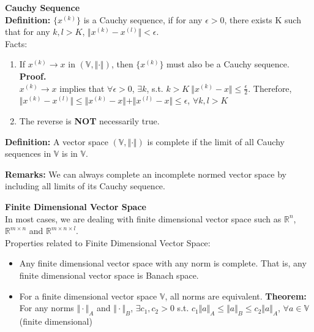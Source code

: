 \documentclass{article}
\begin{document}
\bigbreak

\textbf{Cauchy Sequence} \\
\textbf{Definition:} $\{x^{(k)}\}$ is a Cauchy sequence, if for any $\epsilon >  0$, there exists K such that for any $k,l >  K$, $\Vert x^{(k)} - x^{(l)} \Vert <  \epsilon$.  \\
    Facts: 
    \begin{enumerate}
        \item If $x^{(k)} \to x$ in $(\mathbb{V},\Vert \cdot \Vert)$, then $\{x^{(k)}\}$ must also be a Cauchy sequence. \\
        \textbf{Proof.} \\
        $x^{(k)} \to x$ implies that $\forall \epsilon >  0$, $\exists k$, s.t. $k >  K \ \Vert x^{(k)} - x \Vert \leq \frac{\epsilon}{2}$. Therefore, $\Vert x^{(k)} - x^{(l)} \Vert \leq \Vert x^{(k)} - x \Vert + \Vert x^{(l)} - x \Vert \leq \epsilon$, $\forall k, l >  K$
        \pagebreak
        \item The reverse is \textbf{NOT} necessarily true. 
    \end{enumerate}
    
\textbf{Definition:} A vector space $(\mathbb{V},\Vert \cdot \Vert)$ is complete if the limit of all Cauchy sequences in $\mathbb{V}$ is in $\mathbb{V}$. \\


\bigbreak

\textbf{Remarks:} We can always complete an incomplete normed vector space by including all limits of its Cauchy sequence.

\bigbreak 

\textbf{Finite Dimensional Vector Space} \\
In most cases, we are dealing with finite dimensional vector space such as $\mathbb{R}^{n}$, $\mathbb{R}^{m \times n}$ and $\mathbb{R}^{m \times n \times l}$. \\
\bigbreak
Properties related to Finite Dimensional Vector Space:\\
    \begin{itemize}
        \item Any finite dimensional vector space with any norm is complete. That is, any finite dimensional vector space is Banach space.
        \item For a finite dimensional vector space $\mathbb{V}$, all norms are equivalent. 
        \textbf{Theorem:} For any norms $\Vert \cdot \Vert_A$ and $\Vert \cdot \Vert_B$, $\exists c_1, c_2 >  0$ s.t. $c_1 \Vert a \Vert_A \leq \Vert a \Vert_B \leq c_2\Vert a \Vert_A$, $\forall a \in \mathbb{V}$ (finite dimensional) \\  
    \end{itemize}
    
\end{document}
